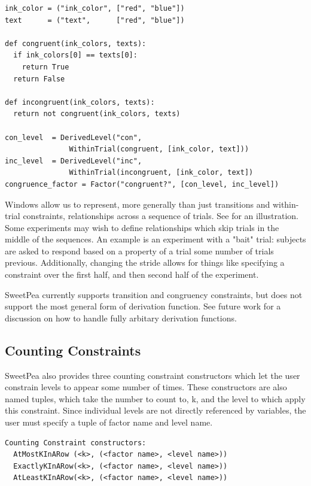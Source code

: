\begin{verbatim}
ink_color = ("ink_color", ["red", "blue"])
text      = ("text",      ["red", "blue"])

def congruent(ink_colors, texts):
  if ink_colors[0] == texts[0]:
    return True
  return False

def incongruent(ink_colors, texts):
  return not congruent(ink_colors, texts)

con_level  = DerivedLevel("con",
               WithinTrial(congruent, [ink_color, text]))
inc_level  = DerivedLevel("inc",
               WithinTrial(incongruent, [ink_color, text])
congruence_factor = Factor("congruent?", [con_level, inc_level])
\end{verbatim}

Windows allow us to represent, more generally than just transitions and within-trial constraints, relationships across a sequence of trials. See  for an illustration. Some experiments may wish to define relationships which skip trials in the middle of the sequences. An example is an experiment with a "bait" trial: subjects are asked to respond based on a property of a trial some number of trials previous. Additionally, changing the stride allows for things like specifying a constraint over the first half, and then second half of the experiment.

SweetPea currently supports transition and congruency constraints, but does not support the most general form of derivation function. See future work for a discussion on how to handle fully arbitary derivation functions.

\subsection{Counting Constraints}
SweetPea also provides three counting constraint constructors which let the user constrain levels to appear some number of times. These constructors are also named tuples, which take the number to count to, k, and the level to which apply this constraint. Since individual levels are not directly referenced by variables, the user must specify a tuple of factor name and level name.

\begin{verbatim}
Counting Constraint constructors:
  AtMostKInARow (<k>, (<factor name>, <level name>))
  ExactlyKInARow(<k>, (<factor name>, <level name>))
  AtLeastKInARow(<k>, (<factor name>, <level name>))
\end{verbatim}

